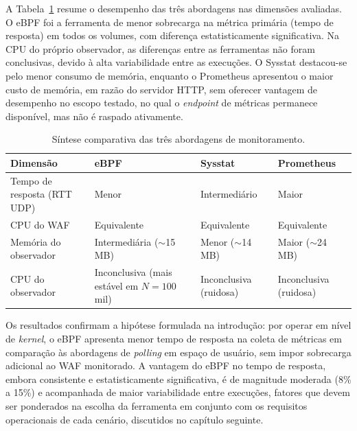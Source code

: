 A Tabela~\ref{tab:sintese} resume o desempenho das três abordagens nas dimensões avaliadas. O eBPF foi a ferramenta de menor sobrecarga na métrica primária (tempo de resposta) em todos os volumes, com diferença estatisticamente significativa. Na CPU do próprio observador, as diferenças entre as ferramentas não foram conclusivas, devido à alta variabilidade entre as execuções. O Sysstat destacou-se pelo menor consumo de memória, enquanto o Prometheus apresentou o maior custo de memória, em razão do servidor HTTP, sem oferecer vantagem de desempenho no escopo testado, no qual o \textit{endpoint} de métricas permanece disponível, mas não é raspado ativamente.

\begin{table}[htbp]
\centering
\caption{Síntese comparativa das três abordagens de monitoramento.}
\label{tab:sintese}
\begin{tabularx}{\textwidth}{lXXX}
\hline
\textbf{Dimensão} & \textbf{eBPF} & \textbf{Sysstat} & \textbf{Prometheus} \\
\hline
Tempo de resposta (RTT UDP) & Menor & Intermediário & Maior \\
CPU do WAF & Equivalente & Equivalente & Equivalente \\
Memória do observador & Intermediária ($\sim$15 MB) & Menor ($\sim$14 MB) & Maior ($\sim$24 MB) \\
CPU do observador & Inconclusiva (mais estável em $N = 100$ mil) & Inconclusiva (ruidosa) & Inconclusiva (ruidosa) \\
\hline
\end{tabularx}
\end{table}

Os resultados confirmam a hipótese formulada na introdução: por operar em nível de \textit{kernel}, o eBPF apresenta menor tempo de resposta na coleta de métricas em comparação às abordagens de \textit{polling} em espaço de usuário, sem impor sobrecarga adicional ao WAF monitorado. A vantagem do eBPF no tempo de resposta, embora consistente e estatisticamente significativa, é de magnitude moderada (8\% a 15\%) e acompanhada de maior variabilidade entre execuções, fatores que devem ser ponderados na escolha da ferramenta em conjunto com os requisitos operacionais de cada cenário, discutidos no capítulo seguinte.
